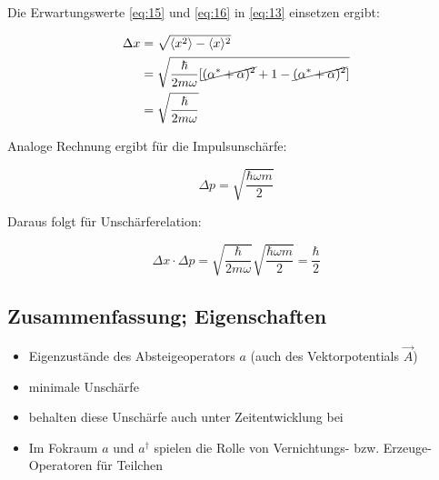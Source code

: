 Die Erwartungswerte \eqref{eq:15} und \eqref{eq:16} in \eqref{eq:13} einsetzen ergibt:

\begin{align}
  \label{eq:17}
  \Delta x &= \sqrt{ \langle x^2\rangle -\langle x\rangle^2 }  \notag\\
 &=\sqrt{\frac{\hbar}{2m\omega}[\cancel{( \alpha^*+\alpha)^2} + 1 - \cancel{ (\alpha^* + \alpha)^2}  ]} \notag\\
 &=\sqrt{\frac{\hbar}{2m\omega}}
\end{align}

Analoge Rechnung ergibt für die Impulsunschärfe:

\begin{equation}
  \label{eq:18}
  \Delta p = \sqrt{\frac{\hbar \omega m}{2}}
\end{equation}

Daraus folgt für Unschärferelation:

\begin{equation}
  \label{eq:19}
  \Delta x\cdot\Delta p = \sqrt{\frac{\hbar}{2m\omega}} \sqrt{\frac{\hbar \omega m}{2}} = \frac{\hbar}{2}
\end{equation}


\subsection{Zusammenfassung; Eigenschaften}

\begin{itemize}
\item Eigenzustände des Absteigeoperators \(a\) (auch des Vektorpotentials \(\vec A\))
\item minimale Unschärfe
\item behalten diese Unschärfe auch unter Zeitentwicklung bei
\item Im Fokraum \(a\) und \(a^\dagger\) spielen die Rolle von Vernichtungs- bzw. Erzeuge-Operatoren für Teilchen
\end{itemize}


